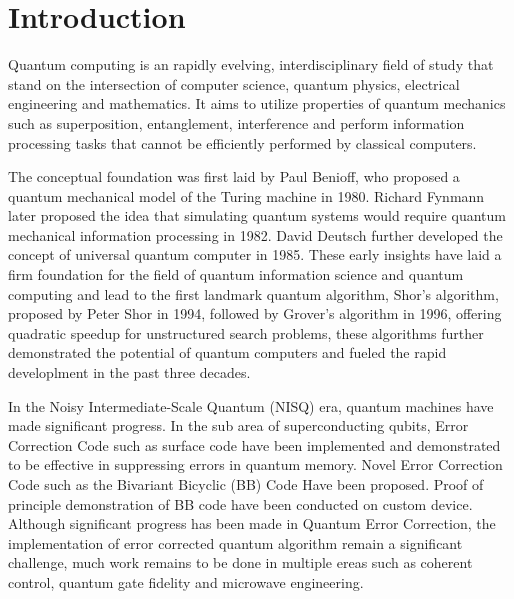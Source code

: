 \documentclass[%
 reprint,
 amsmath,amssymb,
 aps,
]{revtex4-2}
\begin{document}
\maketitle


\section{\label{sec:intro}Introduction}

Quantum computing is an rapidly evelving, interdisciplinary field of study that stand on the intersection of computer science, quantum physics, electrical engineering and mathematics. It aims to utilize properties of quantum mechanics such as superposition, entanglement, interference and perform information processing tasks that cannot be efficiently performed by classical computers.

The conceptual foundation was first laid by Paul Benioff, who proposed a quantum mechanical model of the Turing machine in 1980\cite{benioff1980computer}. Richard Fynmann later proposed the idea that simulating quantum systems would require quantum mechanical information processing in 1982\cite{feynman1982simulating}. David Deutsch further developed the concept of universal quantum computer in 1985\cite{deutsch1985quantum}. These early insights have laid a firm foundation for the field of quantum information science and quantum computing and lead to the first landmark quantum algorithm, Shor's algorithm, proposed by Peter Shor in 1994\cite{shor1994algorithms}, followed by Grover's algorithm in 1996, offering quadratic speedup for unstructured search problems\cite{grover1996fast}, these algorithms further demonstrated the potential of quantum computers and fueled the rapid developlment in the past three decades.

In the Noisy Intermediate-Scale Quantum (NISQ) era, quantum machines have made significant progress. In the sub area of superconducting qubits, Error Correction Code such as surface code have been implemented and demonstrated to be effective in suppressing errors in quantum memory\cite{qec_ggl}. Novel Error Correction Code such as the Bivariant Bicyclic (BB) Code Have been proposed\cite{qec_ibm_2024}. Proof of principle demonstration of BB code have been conducted on custom device\cite{wang2025demonstration}. Although significant progress has been made in Quantum Error Correction, the implementation of error corrected quantum algorithm remain a significant challenge, much work remains to be done in multiple ereas such as coherent control, quantum gate fidelity and microwave engineering. 
\end{document}
